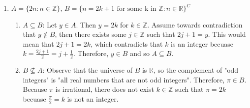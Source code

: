 \documentclass{article}
\begin{document}
\begin{enumerate}
    \item $A = \{2n : n \in \mathbb{Z}\}$, $B = \{n = 2k + 1 \text{ for some k in }\mathbb{Z} : n \in \mathbb{R} \}^C$
    \begin{mdframed}
        \begin{enumerate}
            \item $A \subseteq B$: Let $y \in A$. Then $y = 2k$ for $k \in \mathbb{Z}$. Assume towards contradiction that $y \notin B$, then there exists some $j \in \mathbb{Z}$ such that $2j + 1 = y$. This would mean that $2j + 1 = 2k$, which contradicts that $k$ is an integer becuase $k = \frac{2j + 1}{2} = j + \frac{1}{2}$. Therefore, $y \in B$ and so $A \subseteq B$.
            \item $B \not\subseteq A$: Observe that the universe of $B$ is $\mathbb{R}$, so the complement of "odd integers" is "all real numbers that are not odd integers". Therefore, $\pi \in B$. Because $\pi$ is irrational, there does not exist $k \in \mathbb{Z}$ such that $\pi = 2k$ becuase $\frac{\pi}{2} = k$ is not an integer.
        \end{enumerate}
    \end{mdframed}
\end{enumerate}
\end{document}
